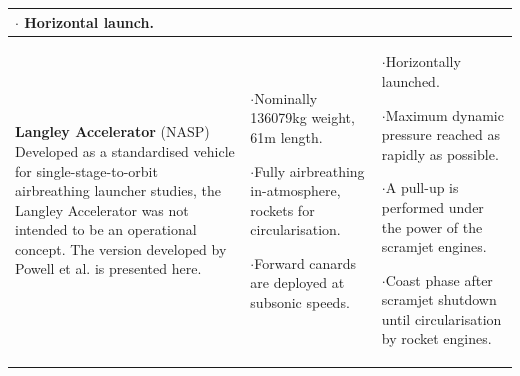 {\begin{landscape}
\begin{xltabular}{\linewidth}{|X|X|X|}
$\cdot$ Horizontal launch.
\\
\hline\small \textbf{Langley Accelerator} (NASP)\cite{WCC,Powell1991,Lu1993} 
\newline  \newline Developed as a standardised vehicle for single-stage-to-orbit airbreathing launcher studies, the Langley Accelerator was not intended to be an operational concept. The version developed by Powell et al.\cite{Powell1991} is presented here. 
&
\small
{} 

$\cdot$Nominally 136079kg weight, 61m length.

$\cdot$Fully airbreathing in-atmosphere, rockets for circularisation.

$\cdot$Forward canards are deployed at subsonic speeds.

&
\small
{} 

$\cdot$Horizontally launched. 

$\cdot$Maximum dynamic pressure reached as rapidly as possible. 

$\cdot$A pull-up is performed under the power of the scramjet engines. 

$\cdot$Coast phase after scramjet shutdown until circularisation by rocket engines.


\end{xltabular}
\end{landscape}}
